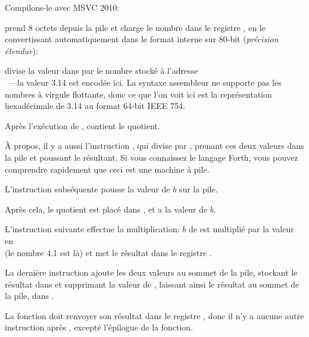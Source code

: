 
Compilons-le avec MSVC 2010:



\FLD prend 8 octets depuis la pile et charge le nombre dans le registre , en
le convertissant automatiquement dans le format interne sur 80-bit (\emph{précision
étendue}):


\FDIV divise la valeur dans  par le nombre stocké à l'adresse \\
~---la valeur 3.14 est encodée ici.
La syntaxe assembleur ne supporte pas les nombres à virgule flottante, donc ce que
l'on voit ici est la représentation hexadécimale de 3.14 au format 64-bit IEEE 754.

Après l'exécution de \FDIV,  contient le \gls{quotient}.


À propos, il y a aussi l'instruction \FDIVP, qui divise  par , prenant
ces deux valeurs dans la pile et poussant le résultant.
Si vous connaissez le langage Forth, vous pouvez comprendre rapidement
que ceci est une machine à pile.

L'instruction \FLD subséquente pousse la valeur de $b$ sur la pile.

Après cela, le quotient est placé dans , et  a la valeur de $b$.


L'instruction suivante effectue la multiplication: $b$ de  est multiplié par
la valeur en\\
 (le nombre 4.1 est là) et met le résultat
dans le registre .


La dernière instruction \FADDP ajoute les deux valeurs au sommet de la pile, stockant
le résultat dans  et supprimant la valeur de , laissant ainsi le résultat
au sommet de la pile, dans .

La fonction doit renvoyer son résultat dans le registre , donc il n'y a aucune
autre instruction après \FADDP, excepté l'épilogue de la fonction.


